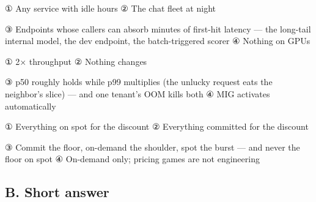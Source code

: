 
\begin{tbboptions}
  \item ① Any service with idle hours        ② The chat fleet at night
  \item ③ Endpoints whose callers can absorb minutes of first-hit latency — the long-tail internal model, the dev endpoint, the batch-triggered scorer        ④ Nothing on GPUs
\end{tbboptions}


\begin{tbboptions}
  \item ① 2× throughput        ② Nothing changes
  \item ③ p50 roughly holds while p99 multiplies (the unlucky request eats the neighbor's slice) — and one tenant's OOM kills both        ④ MIG activates automatically
\end{tbboptions}


\begin{tbboptions}
  \item ① Everything on spot for the discount        ② Everything committed for the discount
  \item ③ Commit the floor, on-demand the shoulder, spot the burst — and never the floor on spot        ④ On-demand only; pricing games are not engineering
\end{tbboptions}

\subsection*{B. Short answer}





